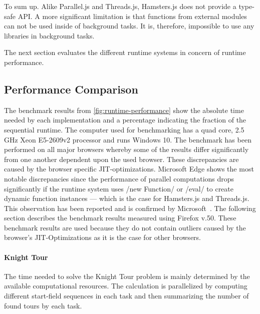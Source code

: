 To sum up. Alike Parallel.js and Threads.js, Hamsters.js does not provide a type-safe API. A more significant limitation is that functions from external modules can not be used inside of background tasks. It is, therefore, impossible to use any libraries in background tasks. 

The next section evaluates the different runtime systems in concern of runtime performance. 

\subsection{Performance Comparison}
The benchmark results from \cref{fig:runtime-performance} show the absolute time needed by each implementation and a percentage indicating the fraction of the sequential runtime. The computer used for benchmarking has a quad core, 2.5 GHz Xeon E5-2609v2 processor and runs Windows 10. The benchmark has been performed on all major browsers whereby some of the results differ significantly from one another dependent upon the used browser. These discrepancies are caused by the browser specific JIT-optimizations. Microsoft Edge shows the most notable discrepancies since the performance of parallel computations drops significantly if the runtime system uses \javascriptinline/new Function/ or \javascriptinline/eval/ to create dynamic function instances --- which is the case for Hamsters.js and Threads.js. This observation has been reported and is confirmed by Microsoft~\cite{newFunctionWebWorkerEdge}. The following section describes the benchmark results measured using Firefox v.50. These benchmark results are used because they do not contain outliers caused by the browser's JIT-Optimizations as it is the case for other browsers.

\begin{figure*}
		
	\caption{Runtime Performance of Parallelization Problems Relative to Sequential Execution}
	\label{fig:runtime-performance}
\end{figure*}


\paragraph{Knight Tour} The time needed to solve the Knight Tour problem is mainly determined by the available computational resources. The calculation is parallelized by computing different start-field sequences in each task and then summarizing the number of found tours by each task. 

